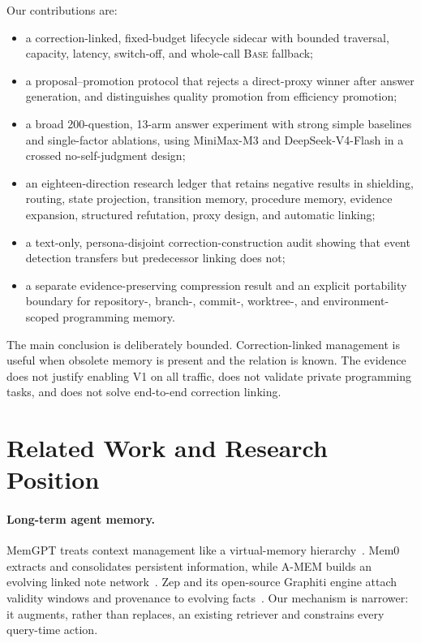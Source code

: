\documentclass[10pt]{article}
\newcommand{\base}{\textsc{Base}\xspace}
\newcommand{\vone}{\textsc{V1}\xspace}
\begin{document}
Our contributions are:
\begin{itemize}
  \item a correction-linked, fixed-budget lifecycle sidecar with bounded traversal, capacity, latency, switch-off, and whole-call \base fallback;
  \item a proposal--promotion protocol that rejects a direct-proxy winner after answer generation, and distinguishes quality promotion from efficiency promotion;
  \item a broad 200-question, 13-arm answer experiment with strong simple baselines and single-factor ablations, using MiniMax-M3 and DeepSeek-V4-Flash in a crossed no-self-judgment design;
  \item an eighteen-direction research ledger that retains negative results in shielding, routing, state projection, transition memory, procedure memory, evidence expansion, structured refutation, proxy design, and automatic linking;
  \item a text-only, persona-disjoint correction-construction audit showing that event detection transfers but predecessor linking does not;
  \item a separate evidence-preserving compression result and an explicit portability boundary for repository-, branch-, commit-, worktree-, and environment-scoped programming memory.
\end{itemize}

The main conclusion is deliberately bounded. Correction-linked management is useful when obsolete memory is present and the relation is known. The evidence does not justify enabling \vone on all traffic, does not validate private programming tasks, and does not solve end-to-end correction linking.

\section{Related Work and Research Position}

\paragraph{Long-term agent memory.}
MemGPT treats context management like a virtual-memory hierarchy~\cite{packer2023memgpt}. Mem0 extracts and consolidates persistent information, while A-MEM builds an evolving linked note network~\cite{chhikara2025mem0,xu2025amem}. Zep and its open-source Graphiti engine attach validity windows and provenance to evolving facts~\cite{rasmussen2025zep,graphiti2026}. Our mechanism is narrower: it augments, rather than replaces, an existing retriever and constrains every query-time action.
\end{document}

